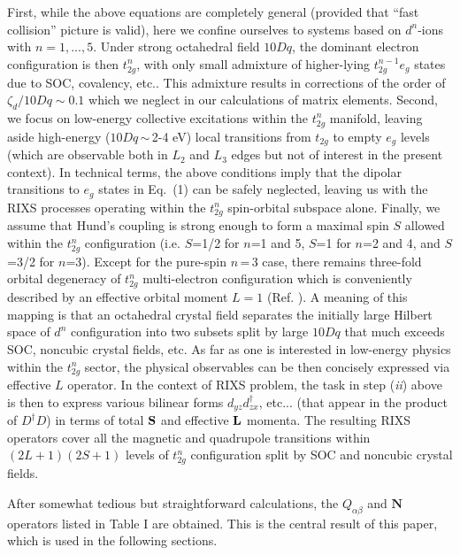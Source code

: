 \documentclass[twocolumn,prb,aps,showpacs,superscriptaddress]{revtex4-1}
\begin{document}
First, while the above equations are completely general (provided that ``fast
collision'' picture is valid), here we confine ourselves to systems based 
on $d^n$-ions with $n=1,...,5$. Under strong octahedral field $10Dq$, the 
dominant electron configuration is then $t_{2g}^n$, with only small admixture 
of higher-lying $t_{2g}^{n-1}e_g$ states due to SOC, covalency,
etc.\cite{Tho68}. This admixture results in corrections of the order of 
$\zeta_d/10Dq \sim 0.1$ which we neglect in our calculations of matrix 
elements. Second, we focus on low-energy collective excitations within the 
$t_{2g}^n$ manifold, leaving aside high-energy ($10Dq$\,$\sim$\,2-4 eV) local 
transitions from $t_{2g}$ to empty $e_g$ levels (which are observable both in 
$L_2$ and $L_3$ edges\cite{Mat16} but not of interest in the present context). 
In technical terms, the above conditions imply that the dipolar transitions 
to $e_g$ states in Eq.~(1) can be safely neglected, leaving us with the RIXS 
processes operating within the $t_{2g}^n$ spin-orbital subspace alone. Finally, 
we assume that Hund's coupling is strong enough to form a maximal spin $S$ 
allowed within the $t_{2g}^n$ configuration (i.e. $S$=1/2 for $n$=1 and 5, 
$S$=1 for $n$=2 and 4, and $S$=3/2 for $n$=3). Except for the pure-spin $n$\,=\,3 case, 
there remains three-fold orbital degeneracy of $t_{2g}^n$ multi-electron 
configuration which is conveniently described by an effective orbital moment 
$L=1$ (Ref. ). A meaning of this mapping is that an octahedral crystal 
field separates the initially large Hilbert space of $d^n$ configuration into two 
subsets split by large $10Dq$ that much exceeds SOC, noncubic crystal fields, 
etc. As far as one is interested in low-energy physics within the $t_{2g}^n$ 
sector, the physical observables can be then concisely expressed via 
effective $L$ operator. In the context of RIXS problem, the task in 
step ({\it ii}) above is then to express various bilinear forms 
$d_{yz}d_{zx}^\dagger$, etc... (that appear in the product of 
$D^\dagger D$) in terms of total ${\bf S}$ and effective ${\bf L}$ momenta. 
The resulting RIXS operators cover all the magnetic and quadrupole transitions 
within $(2L+1)(2S+1)$ levels of $t_{2g}^n$ configuration split by SOC and 
noncubic crystal fields. 

After somewhat tedious but straightforward calculations, the $Q_{\alpha\beta}$ 
and ${\mathbf N}$ operators listed in Table I are obtained. This is the 
central result of this paper, which is used in the following sections.  
\end{document}
